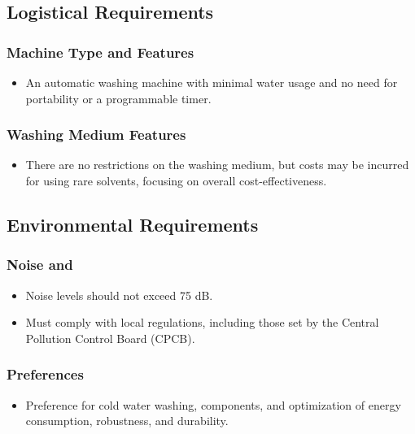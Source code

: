 \documentclass[table,french,english]{rapportCS}
\begin{document}
\subsection{Logistical Requirements}\label{sec:logireq}
\subsubsection{Machine Type and Features}\label{sec:machtype}
    \begin{itemize}[label=$\bullet$]
      \item An automatic washing machine with minimal water usage and no need for portability or a programmable timer.
    \end{itemize}
\subsubsection{Washing Medium Features}\label{sec:wmtype}
    \begin{itemize}[label=$\bullet$]
      \item There are no restrictions on the washing medium, but costs may be incurred for using rare solvents, focusing on overall cost-effectiveness.
    \end{itemize}

\subsection{ Environmental Requirements}\label{subsec:envireq}
\subsubsection{Noise and }\label{sec:noisecomp}
    \begin{itemize}[label=$\bullet$]
      \item Noise levels should not exceed 75 dB.
      \item Must comply with local regulations, including those set by the Central Pollution Control Board (CPCB).
    \end{itemize}
  
  \subsubsection{ Preferences}\label{sec:suspref}
    \begin{itemize}[label=$\bullet$]
      \item Preference for cold water washing,   components, and optimization of energy consumption, robustness, and durability.
    \end{itemize}
\end{document}
